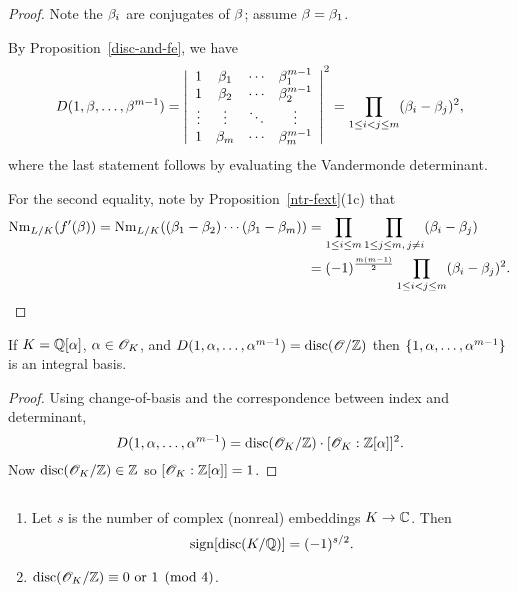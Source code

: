 \begin{proof}
Note the $\beta_i$ are conjugates of $\beta$; assume $\beta=\beta_1$.

By Proposition~\ref{disc-and-fe}, we have
\[
D(1,\beta,\ldots, \beta^{m-1})=
\left|\begin{array}{cccc}
1 & \beta_{1} & \cdots & \beta_1^{m-1}\\
1 & \beta_{2} & \cdots & \beta_{2}^{m-1}\\
\vdots & \vdots & \ddots & \vdots\\
1 & \beta_{m} & \cdots & \beta_{m}^{m-1}\end{array}\right|^{2}
=
\prod_{1\leq i<j\leq m}(\beta_i-\beta_j)^2,
\]
where the last statement follows by evaluating the Vandermonde determinant.

For the second equality, note by Proposition~\ref{ntr-fext}(1c) that
\begin{align*}
\operatorname{Nm}_{L/K}(f'(\beta))=\operatorname{Nm}_{L/K}((\beta_1-\beta_2)\cdots (\beta_1-\beta_m))&=\prod_{1\le i\le m}\prod_{1\le j\le m,\,j\ne i}
(\beta_i-\beta_j)\\
&=(-1)^{\frac{m(m-1)}2}
\prod_{1\leq i<j\leq m}(\beta_i-\beta_j)^2.
\end{align*}
\end{proof}
\begin{pr}%
If $K=\mathbb{Q}[\alpha]$, $\alpha\in \mathscr{O}_K$, and $D(1,\alpha,\ldots, \alpha^{m-1})=\operatorname{disc}(\mathscr{O}/\mathbb{Z})$ then $\{1,\alpha,\ldots, \alpha^{m-1}\}$ is an integral basis.
\end{pr}
\begin{proof}
Using change-of-basis and the correspondence between index and determinant,
\[
D(1,\alpha,\ldots, \alpha^{m-1})=\operatorname{disc}(\mathscr{O}_K/\mathbb{Z})\cdot [\mathscr{O}_K:\mathbb{Z}[\alpha]]^2.
\]
Now $\operatorname{disc}(\mathscr{O}_K/\mathbb{Z})\in \mathbb{Z}$ so $[\mathscr{O}_K:\mathbb{Z}[\alpha]]=1$.
\end{proof}
\begin{thm}$\,$
\begin{enumerate}
\item Let $s$ is the number of %
complex (nonreal) embeddings $K\to \mathbb{C}$. 
Then
\[\operatorname{sign}[\operatorname{disc}(K/\mathbb{Q})]=(-1)^{s/2}.\] 
\item $\operatorname{disc}(\mathscr{O}_K/\mathbb{Z})\equiv 0\text{ or } 1\pmod 4$.
\end{enumerate}
\end{thm}
